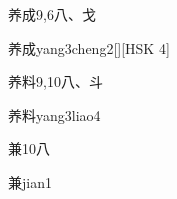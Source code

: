 \begin{entry}{养成}{9,6}{⼋、⼽}
  \begin{phonetics}{养成}{yang3cheng2}[][HSK 4]
  \end{phonetics}
\end{entry}

\begin{entry}{养料}{9,10}{⼋、⽃}
  \begin{phonetics}{养料}{yang3liao4}
  \end{phonetics}
\end{entry}

\begin{entry}{兼}{10}{⼋}
  \begin{phonetics}{兼}{jian1}
  \end{phonetics}
\end{entry}


